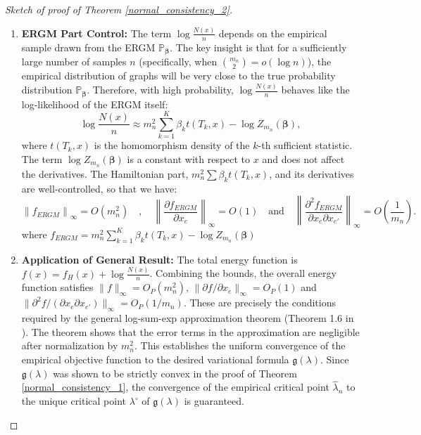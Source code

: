 \documentclass[12pt]{article}
\def\P{\mathbb{P}}
\numberwithin{equation}{section}
\def\bbeta{\boldsymbol{\beta}}
\begin{document}
\begin{proof}[Sketch of proof of Theorem \ref{normal_consistency_2}]
\begin{enumerate}
    \item \textbf{ERGM Part Control:} The term $\log\frac{N(x)}{n}$ depends on the empirical sample drawn from the ERGM $\P_{\bbeta}$. The key insight is that for a sufficiently large number of samples $n$ (specifically, when $\binom{m_n}{2} = o(\log n)$), the empirical distribution of graphs will be very close to the true probability distribution $\P_{\bbeta}$. Therefore, with high probability, $\log\frac{N(x)}{n}$ behaves like the log-likelihood of the ERGM itself:
    \[
    \log\frac{N(x)}{n} \approx m_n^2\sum_{k=1}^K \beta_k t(T_k,x) - \log Z_{m_n}(\bbeta),
    \]
    where $t(T_k,x)$ is the homomorphism density of the $k$-th sufficient statistic. The term $\log Z_{m_n}(\bbeta)$ is a constant with respect to $x$ and does not affect the derivatives. The Hamiltonian part, $m_n^2\sum \beta_k t(T_k,x)$, and its derivatives are well-controlled, so that we have:
    \[
    \left\|f_{ERGM}\right\|_\infty = O(m_n^2) \quad, \quad \left\|\frac{\partial f_{ERGM}}{\partial x_e}\right\|_\infty = O(1) \quad \text{and} \quad \left\|\frac{\partial^2 f_{ERGM}}{\partial x_e\partial x_{e'}}\right\|_\infty = O\left(\frac{1}{m_n}\right).
    \]
    where $f_{ERGM} = m_n^2\sum_{k=1}^K \beta_k t(T_k,x) - \log Z_{m_n}(\bbeta)$
    
    \item \textbf{Application of General Result:} The total energy function is $f(x) = f_H(x) + \log\frac{N(x)}{n}$. Combining the bounds, the overall energy function satisfies $\|f\|_\infty = O_P(m_n^2)$, $\|\partial f / \partial x_e\|_\infty = O_P(1)$ and $\|\partial^2 f / (\partial x_e \partial x_{e'})\|_\infty = O_P(1/m_n)$. These are precisely the conditions required by the general log-sum-exp approximation theorem (Theorem 1.6 in \cite{chatterjee2016nonlinear}). The theorem shows that the error terms in the approximation are negligible after normalization by $m_n^2$. This establishes the uniform convergence of the empirical objective function to the desired variational formula $\mathfrak{g}(\lambda)$. Since $\mathfrak{g}(\lambda)$ was shown to be strictly convex in the proof of Theorem \ref{normal_consistency_1}, the convergence of the empirical critical point $\hat{\lambda}_n$ to the unique critical point $\lambda^{\circ}$ of $\mathfrak{g}(\lambda)$ is guaranteed.
\end{enumerate}
\end{proof}
\end{document}
